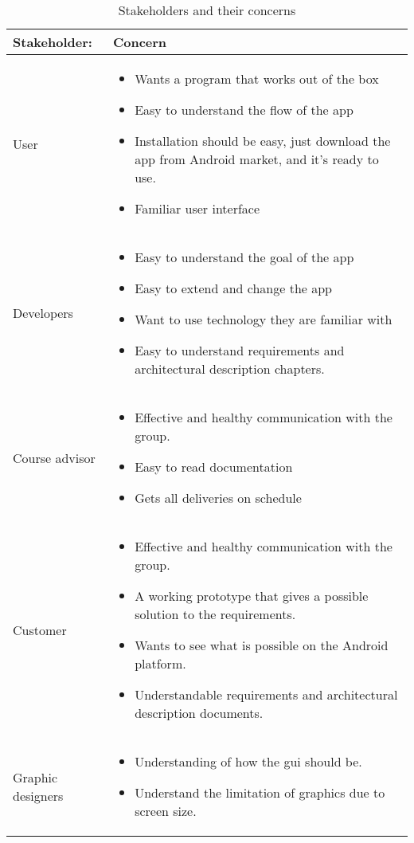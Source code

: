 \begin{table}
\begin{tabular}{p{3.5cm}|p{11.5cm}} \hline
\textbf{Stakeholder:} & \textbf{Concern} \\ \hline \hline
User & 
\begin{itemize}
\item{} Wants a program that works out of the box
\item{} Easy to understand the flow of the app
\item{} Installation should be easy, just download the app from Android market, and it’s ready to use.
\item{} Familiar user interface
\end{itemize}\\ \hline
Developers & 
\begin{itemize}
\item{}Easy to understand the goal of the app
\item{}Easy to extend and change the app
\item{}Want to use technology they are familiar with
\item{}Easy to understand requirements and architectural description chapters.
\end{itemize}\\ \hline
Course advisor & 
\begin{itemize}
\item{}Effective and healthy communication with the group.
\item{}Easy to read documentation
\item{}Gets all deliveries on schedule
\end{itemize}\\ \hline
Customer & 
\begin{itemize}
\item{}Effective and healthy communication with the group.
\item{}A working prototype that gives a possible solution to the requirements.
\item{}Wants to see what is possible on the Android platform.
\item{}Understandable requirements and architectural description documents.
\end{itemize}\\ \hline
Graphic designers & 
\begin{itemize}
\item{}Understanding of how the \gls{gui} should be.
\item{}Understand the limitation of graphics due to screen size.
\end{itemize} \\ \hline
\end{tabular}
\caption{Stakeholders and their concerns} \label{tab:stakeholders}
\end{table}